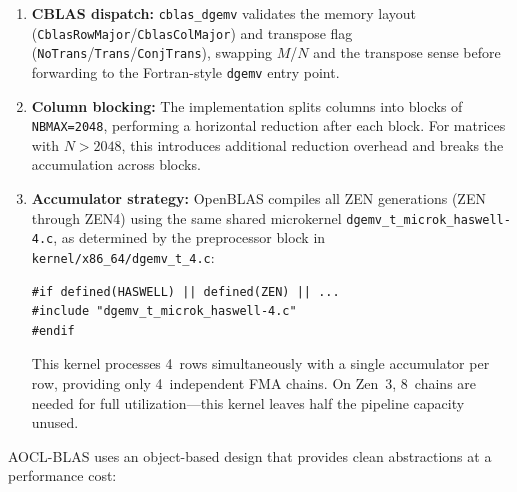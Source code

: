 \documentclass[conference]{IEEEtran}
\begin{document}
\begin{enumerate}
\item \textbf{CBLAS dispatch:} \texttt{cblas\_dgemv} validates the memory
      layout (\texttt{CblasRowMajor}/\texttt{CblasColMajor}) and transpose
      flag (\texttt{NoTrans}/\texttt{Trans}/\texttt{ConjTrans}), swapping
      $M$/$N$ and the transpose sense before forwarding to the Fortran-style
      \texttt{dgemv} entry point.
\item \textbf{Column blocking:} The implementation splits columns into blocks
      of \texttt{NBMAX=2048}, performing a horizontal reduction after each block.
      For matrices with $N > 2048$, this introduces additional reduction overhead
      and breaks the accumulation across blocks.
\item \textbf{Accumulator strategy:} OpenBLAS compiles all ZEN generations
      (ZEN through ZEN4) using the same shared microkernel
      \texttt{dgemv\_t\_microk\_haswell-4.c}, as determined by the preprocessor
      block in \texttt{kernel/x86\_64/dgemv\_t\_4.c}:
      \begin{verbatim}
#if defined(HASWELL) || defined(ZEN) || ...
#include "dgemv_t_microk_haswell-4.c"
#endif
      \end{verbatim}
      This kernel processes 4~rows simultaneously with a single accumulator
      per row, providing only 4~independent FMA chains. On Zen~3, 8~chains are needed for
      full utilization---this kernel leaves half the pipeline capacity unused.
\end{enumerate}

\label{sec:blis}
AOCL-BLAS uses an object-based design that provides clean abstractions at a
performance cost:
\end{document}
